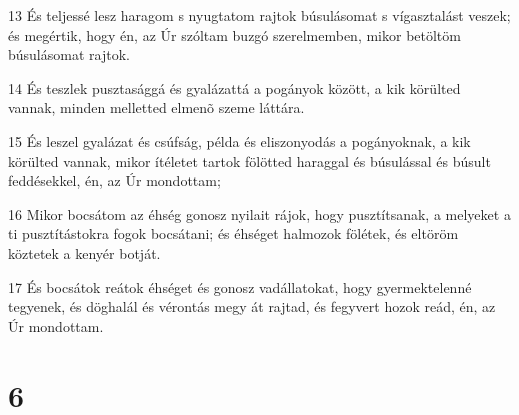 \par 13 És teljessé lesz haragom s nyugtatom rajtok búsulásomat s vígasztalást veszek; és megértik, hogy én, az Úr szóltam buzgó szerelmemben, mikor betöltöm búsulásomat rajtok.
\par 14 És teszlek pusztasággá és gyalázattá a pogányok között, a kik körülted vannak, minden melletted elmenõ szeme láttára.
\par 15 És leszel gyalázat és csúfság, példa és eliszonyodás a pogányoknak, a kik körülted vannak, mikor ítéletet tartok fölötted haraggal és búsulással és búsult feddésekkel, én, az Úr mondottam;
\par 16 Mikor bocsátom az éhség gonosz nyilait rájok, hogy pusztítsanak, a melyeket a ti pusztítástokra fogok bocsátani; és éhséget halmozok fölétek, és eltöröm köztetek a kenyér botját.
\par 17 És bocsátok reátok éhséget és gonosz vadállatokat, hogy gyermektelenné tegyenek, és döghalál és vérontás megy át rajtad, és fegyvert hozok reád, én, az Úr mondottam.

\chapter{6}

